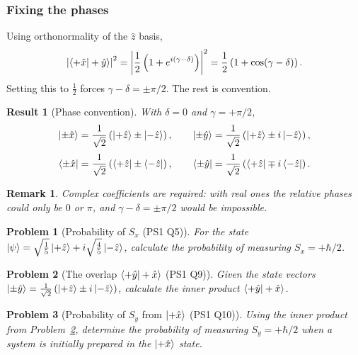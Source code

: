 \documentclass{article}
\newtheorem{problem}{Problem}
\newtheorem{remark}{Remark}
\newtheorem{result}{Result}
\begin{document}
\subsubsection{Fixing the phases}
Using orthonormality of the $\hat{z}$ basis,
\[\left|\braket{+\hat{x}|+\hat{y}}\right|^2 = \left|\frac{1}{2}\left(1 + e^{i(\gamma - \delta)}\right)\right|^2 = \frac{1}{2}\left(1 + \cos(\gamma - \delta)\right).\]
Setting this to $\tfrac12$ forces $\gamma - \delta = \pm\pi/2$. The rest is convention.
\begin{result}[Phase convention]
    With $\delta = 0$ and $\gamma = +\pi/2$,
    \begin{equation}
        \ket{\pm\hat{x}} = \frac{1}{\sqrt{2}}\left(\ket{+\hat{z}} \pm \ket{-\hat{z}}\right), \qquad
        \ket{\pm\hat{y}} = \frac{1}{\sqrt{2}}\left(\ket{+\hat{z}} \pm i\ket{-\hat{z}}\right),
    \end{equation}
    \begin{equation}
        \bra{\pm\hat{x}} = \frac{1}{\sqrt{2}}\left(\bra{+\hat{z}} \pm \bra{-\hat{z}}\right), \qquad \bra{\pm\hat{y}} = \frac{1}{\sqrt{2}}\left(\bra{+\hat{z}} \mp i\bra{-\hat{z}}\right).
    \end{equation}
\end{result}
\begin{remark}
    Complex coefficients are required: with real ones the relative phases could only be $0$ or $\pi$, and $\gamma - \delta = \pm\pi/2$ would be impossible.
\end{remark}
\begin{problem}[Probability of $S_x$ (PS1 Q5)]
    For the state $\ket{\psi} = \sqrt{\tfrac{1}{5}}\ket{+\hat{z}} + i\sqrt{\tfrac{4}{5}}\ket{-\hat{z}}$, calculate the probability of measuring $S_x = +\hbar/2$.
\end{problem}
\begin{problem}[The overlap $\braket{+\hat{y}|+\hat{x}}$ (PS1 Q9)]
    \label{prob:yx-overlap}
    Given the state vectors $\ket{\pm\hat{y}} = \frac{1}{\sqrt{2}}\left(\ket{+\hat{z}} \pm i\ket{-\hat{z}}\right)$, calculate the inner product $\braket{+\hat{y}|+\hat{x}}$.
\end{problem}
\begin{problem}[Probability of $S_y$ from $\ket{+\hat{x}}$ (PS1 Q10)]
    Using the inner product from Problem~\ref{prob:yx-overlap}, determine the probability of measuring $S_y = +\hbar/2$ when a system is initially prepared in the $\ket{+\hat{x}}$ state.
\end{problem}
\end{document}
